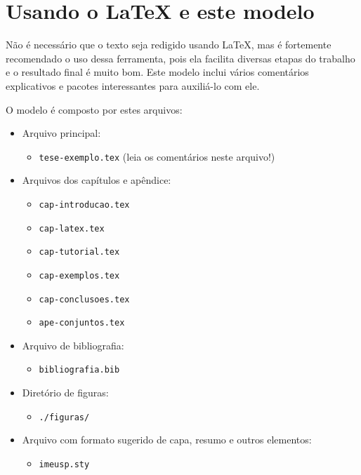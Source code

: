 \chapter{Usando o \LaTeX{} e este modelo}

Não é necessário que o texto seja redigido usando \LaTeX{}, mas é fortemente
recomendado o uso dessa ferramenta, pois ela facilita diversas etapas do
trabalho e o resultado final é muito bom. Este modelo inclui vários
comentários explicativos e pacotes interessantes para auxiliá-lo com ele.

O modelo é composto por estes arquivos:

\begin{itemize}
  \item Arquivo principal:
  \begin{itemize}
	  \item \texttt{tese-exemplo.tex} (leia os comentários neste arquivo!)
  \end{itemize}

  \item Arquivos dos capítulos e apêndice:
  \begin{itemize}
    \item \texttt{cap-introducao.tex}
    \item \texttt{cap-latex.tex}
    \item \texttt{cap-tutorial.tex}
    \item \texttt{cap-exemplos.tex}
    \item \texttt{cap-conclusoes.tex}
    \item \texttt{ape-conjuntos.tex}
  \end{itemize}

  \item Arquivo de bibliografia:
  \begin{itemize}
    \item \texttt{bibliografia.bib}
  \end{itemize}

  \item Diretório de figuras:
  \begin{itemize}
    \item \texttt{./figuras/}
  \end{itemize}

  \item Arquivo com formato sugerido de capa, resumo e outros elementos:
  \begin{itemize}
    \item \texttt{imeusp.sty}
  \end{itemize}


\end{itemize}
